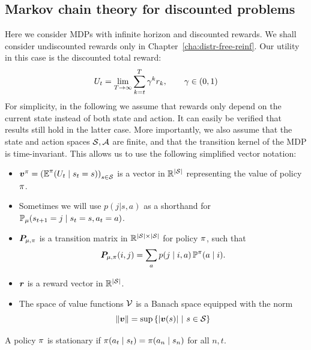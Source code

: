 \subsection{Markov chain theory for discounted problems}
\label{sec:markov-chain-theory}
  Here we consider MDPs with infinite horizon and discounted rewards. We shall consider undiscounted rewards only in Chapter~\ref{cha:distr-free-reinf}.
  Our utility in this case is the discounted total reward:
  \[
  U_t = \lim_{T\to \infty} \sum_{k=t}^T \gamma^k r_k, \qquad \gamma \in (0,1)
  \]
For simplicity, in the following we assume that rewards only depend on the current state instead of both state and action. It can easily be verified that results still hold in the latter case. More importantly, we also assume that the state and action spaces ${\mathcal{S}}, {\mathcal{A}}$ are finite, and that the transition kernel of the MDP is time-invariant. This allows us to use the following simplified vector notation:
\begin{itemize}
\item $\val^\pol = \left(\E^\pol(U_t \mid s_t = s)\right)_{s \in \CS}$ is a vector in ${\mathbb{R}}^{|{\mathcal{S}}|}$ representing the value of policy $\pi$.
\item Sometimes we will use $p(j|s,a)$ as a shorthand for $\mathop{\mbox{\ensuremath{\mathbb{P}}}}\nolimits_{\mu}(s_{t+1} = j \mid s_t = s, a_t = a)$.
\item $\trans_{\mdp,\pol}$ is a transition matrix in ${\mathbb{R}}^{|{\mathcal{S}}|\times|{\mathcal{S}}|}$ for policy $\pi$, such that
  \[
  \trans_{\mdp,\pol}(i,j) = \sum_a p(j \mid i, a) \Pr^\pol(a \mid i).
  \]
\item $\vreward$ is a reward vector in ${\mathbb{R}}^{|{\mathcal{S}}|}$.
\item The space of value functions $\mathcal{V}$ is a Banach space  equipped with the norm
  \[
  \|\val\| = \sup\cset{|\val(s)|}{s \in \CS}
  \]
  
\end{itemize}
  \begin{definition}
    A policy $\pi$ is stationary if $\pi(a_t \mid s_t) = \pi(a_n \mid s_n)$ for all $n, t$. %
    \label{def:stationary-policy}
  \end{definition}
